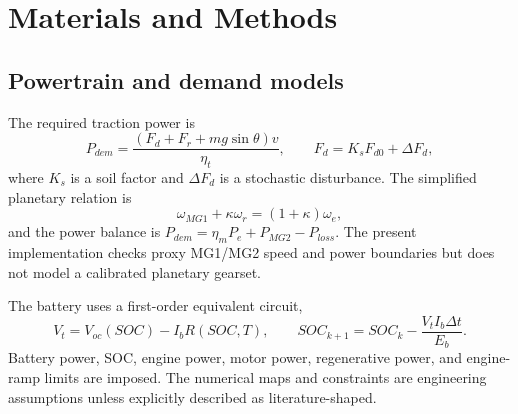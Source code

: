 \documentclass[energies,article,submit,moreauthors]{Definitions/mdpi}
\begin{document}
\section{Materials and Methods}
\subsection{Powertrain and demand models}
The required traction power is
\begin{equation}
 P_{dem}=\frac{(F_d+F_r+mg\sin\theta)v}{\eta_t},\qquad
 F_d=K_sF_{d0}+\Delta F_d,
\end{equation}
where $K_s$ is a soil factor and $\Delta F_d$ is a stochastic disturbance. The simplified planetary relation is
\begin{equation}
 \omega_{MG1}+\kappa\omega_r=(1+\kappa)\omega_e,
\end{equation}
and the power balance is $P_{dem}=\eta_mP_e+P_{MG2}-P_{loss}$. The present implementation checks proxy MG1/MG2 speed and power boundaries but does not model a calibrated planetary gearset.

The battery uses a first-order equivalent circuit,
\begin{equation}
 V_t=V_{oc}(SOC)-I_bR(SOC,T),\qquad
 SOC_{k+1}=SOC_k-\frac{V_tI_b\Delta t}{E_b}.
\end{equation}
Battery power, SOC, engine power, motor power, regenerative power, and engine-ramp limits are imposed. The numerical maps and constraints are engineering assumptions unless explicitly described as literature-shaped.
\end{document}
